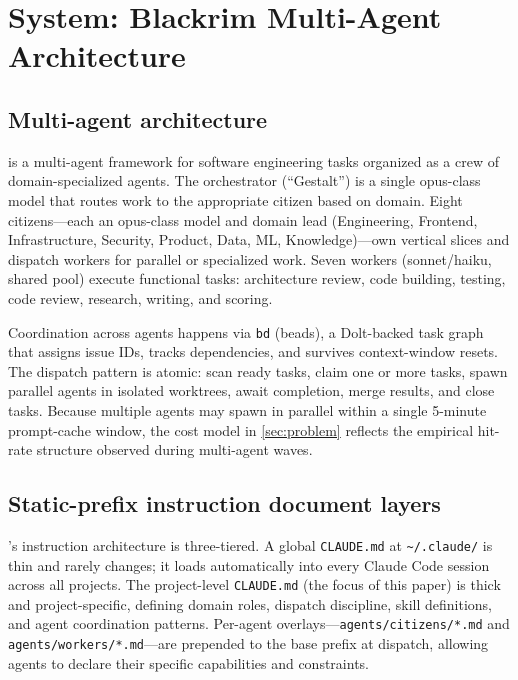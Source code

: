 \section{System: Blackrim Multi-Agent Architecture}
\label{sec:system}

\subsection{Multi-agent architecture}

\blackrim is a multi-agent framework for software engineering tasks organized
as a crew of domain-specialized agents. The orchestrator (``Gestalt'') is a
single opus-class model that routes work to the appropriate citizen based on
domain. Eight citizens—each an opus-class model and domain lead (Engineering,
Frontend, Infrastructure, Security, Product, Data, ML, Knowledge)—own vertical
slices and dispatch workers for parallel or specialized work. Seven workers
(sonnet/haiku, shared pool) execute functional tasks: architecture review,
code building, testing, code review, research, writing, and scoring.

Coordination across agents happens via \texttt{bd} (beads), a Dolt-backed task
graph that assigns issue IDs, tracks dependencies, and survives context-window
resets. The dispatch pattern is atomic: scan ready tasks, claim one or more
tasks, spawn parallel agents in isolated worktrees, await completion, merge
results, and close tasks. Because multiple agents may spawn in parallel within a
single 5-minute prompt-cache window, the cost model in \cref{sec:problem}
reflects the empirical hit-rate structure observed during multi-agent waves.

\subsection{Static-prefix instruction document layers}

\blackrim's instruction architecture is three-tiered. A global \texttt{CLAUDE.md}
at \texttt{\~{}/.claude/} is thin and rarely changes; it loads automatically
into every Claude Code session across all projects. The project-level
\texttt{CLAUDE.md} (the focus of this paper) is thick and project-specific,
defining domain roles, dispatch discipline, skill definitions, and agent
coordination patterns. Per-agent overlays—\texttt{agents/citizens/*.md} and
\texttt{agents/workers/*.md}—are prepended to the base prefix at dispatch,
allowing agents to declare their specific capabilities and constraints.


